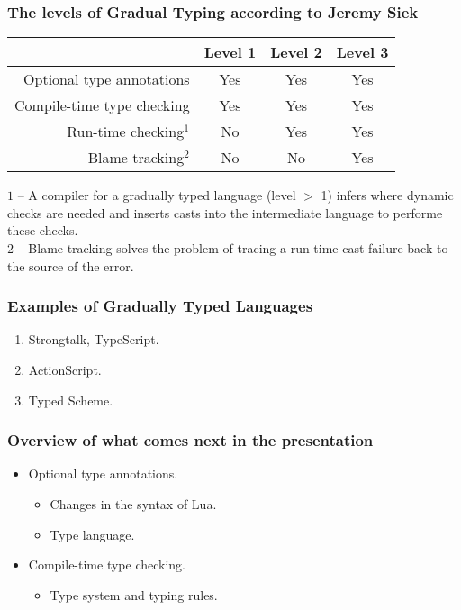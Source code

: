 \documentclass{beamer}
\begin{document}
\begin{frame}
\frametitle{The levels of Gradual Typing according to Jeremy Siek}
\begin{center}
\begin{tabular}{|r|c|c|c|}
\hline
& Level 1 & Level 2 & Level 3\\
\hline
Optional type annotations & Yes & Yes & Yes \\ 
\hline
Compile-time type checking & Yes & Yes & Yes \\
\hline
Run-time checking$^{1}$ & No & Yes & Yes \\
\hline
Blame tracking$^{2}$ & No & No & Yes\\
\hline
\end{tabular}
\end{center}
$1$ -- A compiler for a gradually typed language (level $>$ 1) infers
where dynamic checks are needed and inserts casts into the intermediate
language to performe these checks.\\
$2$ -- Blame tracking solves the problem of tracing a run-time cast
failure back to the source of the error.
\end{frame}

\begin{frame}
\frametitle{Examples of Gradually Typed Languages}
\begin{enumerate}
\item Strongtalk, TypeScript.
\item ActionScript.
\item Typed Scheme.
\end{enumerate}
\end{frame}

\begin{frame}
\frametitle{Overview of what comes next in the presentation}
\begin{itemize}
\item Optional type annotations.
\begin{itemize}
\item Changes in the syntax of Lua.
\item Type language.
\end{itemize}
\item Compile-time type checking.
\begin{itemize}
\item Type system and typing rules.
\end{itemize}
\end{itemize}
\end{frame}
\end{document}
